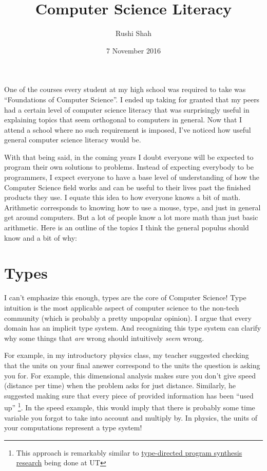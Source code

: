 \documentclass[12pt]{article}
\title{Computer Science Literacy}
\author{Rushi Shah}
\date{7 November 2016}
\begin{document}
  \maketitle

    One of the courses every student at my high school was required to take was ``Foundations of Computer Science''. I ended up taking for granted that my peers had a certain level of computer science literacy that was surprisingly useful in explaining topics that seem orthogonal to computers in general. Now that I attend a school where no such requirement is imposed, I've noticed how useful general computer science literacy would be. 

    With that being said, in the coming years I doubt everyone will be expected to program their own solutions to problems. Instead of expecting everybody to be programmers, I expect everyone to have a base level of understanding of how the Computer Science field works and can be useful to their lives past the finished products they use. I equate this idea to how everyone knows a bit of math. Arithmetic corresponds to knowing how to use a mouse, type, and just in general get around computers. But a lot of people know a lot more math than just basic arithmetic. Here is an outline of the topics I think the general populus should know and a bit of why:

    \section{Types}

      I can't emphasize this enough, types are the core of Computer Science! Type intuition is the most applicable aspect of computer science to the non-tech community (which is probably a pretty unpopular opinion). I argue that every domain has an implicit type system. And recognizing this type system can clarify why some things that \textit{are} wrong should intuitively \textit{seem} wrong.

      For example, in my introductory physics class, my teacher suggested checking that the units on your final answer correspond to the units the question is asking you for. For example, this dimensional analysis makes sure you don't give speed (distance per time) when the problem asks for just distance. Similarly, he suggested making sure that every piece of provided information has been ``used up'' \footnote{This approach is remarkably similar to \href{http://www.cs.utexas.edu/~yufeng/papers/sypet.pdf}{type-directed program synthesis research} being done at UT}. In the speed example, this would imply that there is probably some time variable you forgot to take into account and multiply by. In physics, the units of your computations represent a type system!
\end{document}
